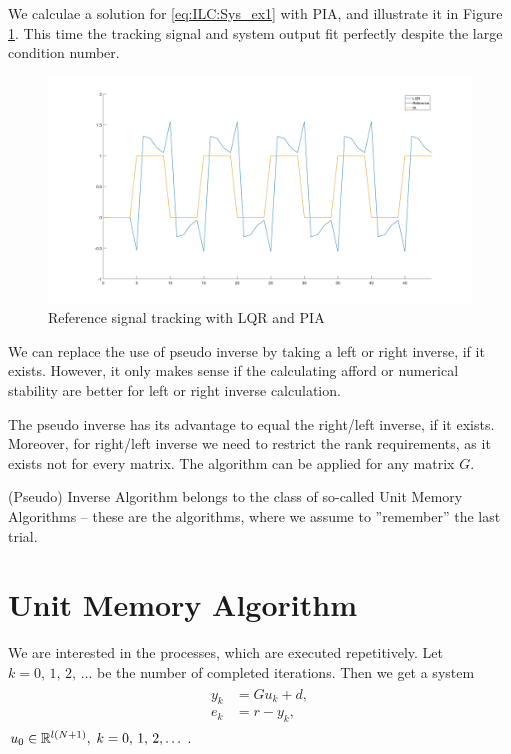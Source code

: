 \begin{exam}
	We calculae a solution for \eqref{eq:ILC:Sys_ex1} with PIA, and illustrate it in Figure \ref{fig:ILC:ex1_PIA}. 	
	This time the tracking signal and system output fit perfectly despite the large condition number. 	
	
	\begin{figure}[ht!]
		\centering
		\includegraphics[width=\textwidth]{fig/ex1_PIA.jpg}
		\caption{Reference signal tracking with LQR and PIA}
		\label{fig:ILC:ex1_PIA}
	\end{figure}
\end{exam}


We can replace the use of pseudo inverse by taking a left or right inverse, if it exists. 
However, it  only makes sense if the calculating afford or numerical stability are better for left or right inverse calculation. 

The pseudo inverse has its advantage to equal the right/left inverse, if it exists. Moreover, for right/left inverse we need to restrict the rank requirements, as it exists not for every matrix. 
The algorithm can be applied for any matrix $G$. 

(Pseudo) Inverse Algorithm belongs to the class of so-called Unit Memory Algorithms -- these are the algorithms, where we assume to  ''remember'' the last trial. 

\section{Unit Memory Algorithm}

We are interested in  the processes, which are executed repetitively. Let $k = 0, \, 1, \, 2, \, \dots $ be the number of completed iterations. Then we get a system 
\begin{align}
\label{eq:unitMemory}
\begin{split}
y_{k} &= G u_k + d,  \\ %
e_k &= r - y_k, 
\end{split}
\end{align}
$u_{0} \in {\mathbb{R}}^{l(N+1)},  \; k =0, \,  1, \, 2, \dots $.

